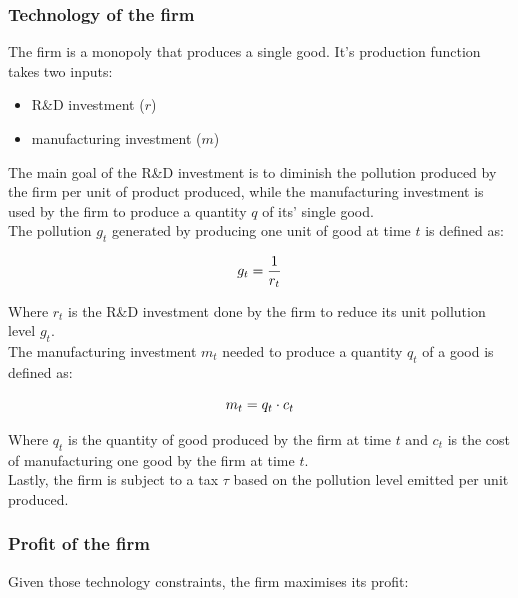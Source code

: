 \documentclass{article}
\begin{document}
\subsubsection{Technology of the firm}

The firm is a monopoly that produces a single good. It's production function takes two inputs: 

\begin{itemize}
    \item R\&D investment ($r$)
    \item manufacturing investment ($m$) 
\end{itemize}

The main goal of the R\&D investment is to diminish the pollution produced by the firm per unit of product produced, while the manufacturing investment is used by the firm to produce a quantity $q$ of its' single good. \\

The pollution $g_{t}$ generated by producing one unit of good at time $t$ is defined as:

\begin{equation}
g_{t}=\frac{1}{r_{t}} \\
\end{equation}

Where $r_{t}$ is the R\&D investment done by the firm to reduce its unit pollution level $g_{t}$. \\

The manufacturing investment $m_{t}$ needed to produce a quantity $q_{t}$ of a good is defined as: 

\begin{equation}
m_{t} = q_{t}\cdot c_{t}\\
\end{equation}

Where $q_{t}$ is the quantity of good produced by the firm at time $t$ and $c_{t}$ is the cost of manufacturing one good by the firm at time $t$.\\

Lastly, the firm is subject to a tax $\tau$ based on the pollution level emitted per unit produced. \\

\subsubsection{Profit of the firm}
Given those technology constraints, the firm maximises its profit: 
\end{document}
